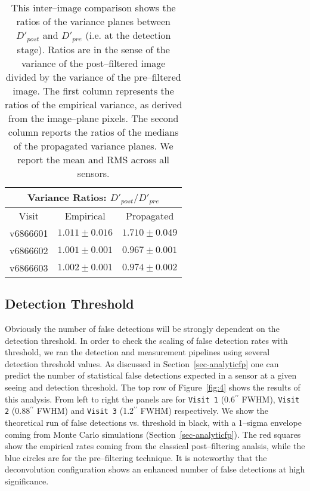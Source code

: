 \documentclass[iop]{emulateapj}
\begin{document}
\begin{table*}[t]
\centering
\begin{tabular}{ccc}
\hline
\multicolumn{3}{|c|}{Variance Ratios: $D'_{post} / D'_{pre}$} \\
\hline
Visit    & Empirical & Propagated \\
\hline
v6866601 & $1.011 \pm 0.016$    & $1.710 \pm 0.049$    \\
v6866602 & $1.001 \pm 0.001$    & $0.967 \pm 0.001$    \\
v6866603 & $1.002 \pm 0.001$    & $0.974 \pm 0.002$    \\
\end{tabular}
\caption{{\rm This inter--image comparison shows the ratios of the variance planes between $D'_{post}$ and $D'_{pre}$ (i.e. at the detection stage).
  Ratios are in the sense of the variance of the post--filtered image divided by the variance of the pre--filtered image.
  The first column represents the ratios of the empirical variance, as derived from the image--plane pixels.
  The second column reports the ratios of the medians of the propagated variance planes.
  We report the mean and RMS across all sensors.
\label{tab-variance2}}}
\end{table*}


\subsection{Detection Threshold}
Obviously the number of false detections will be strongly dependent on the detection threshold.
In order to check the scaling of false detection rates with threshold, we ran the detection and measurement pipelines using several detection threshold values.
As discussed in Section~\ref{sec-analyticfp} one can predict the number of statistical false detections expected in a sensor at a given seeing and detection threshold.
The top row of Figure~\ref{fig:4} shows the results of this analysis.
From left to right the panels are for {\tt Visit 1} (0.6$^{\prime\prime}$ FWHM), {\tt Visit 2} (0.88$^{\prime\prime}$ FWHM) and {\tt Visit 3} (1.2$^{\prime\prime}$ FWHM) respectively.
We show the theoretical run of false detections vs. threshold in black, with a 1--sigma envelope coming from Monte Carlo simulations (Section~\ref{sec-analyticfp}).
The red squares show the empirical rates coming from the classical post--filtering analsis, while the blue circles are for the pre--filtering technique.
It is noteworthy that the deconvolution configuration shows an enhanced number of false detections at high significance.
\end{document}
